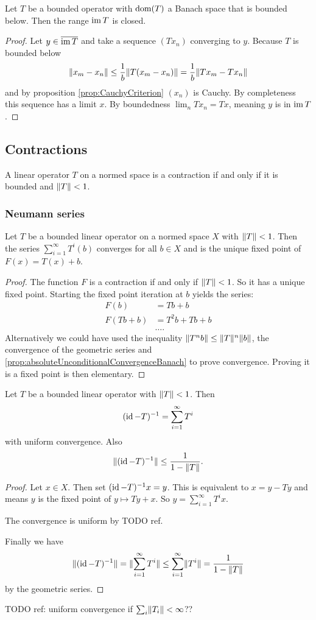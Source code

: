 \begin{proposition} \label{prop:boundedBelowClosedRange}
Let $T$ be a bounded operator with $\operatorname{dom}(T)$ a Banach space that is bounded below. Then the range $\operatorname{im} T$ is closed.
\end{proposition}
\begin{proof}
Let $y\in \overline{\operatorname{im} T}$ and take a sequence $(Tx_n)$ converging to $y$. Because $T$ is bounded below
\[ \lVert x_m-x_n\rVert \leq \frac{1}{b}\lVert T(x_m-x_n)\rVert = \frac{1}{b}\lVert Tx_m-Tx_n\rVert \]
and by proposition \ref{prop:CauchyCriterion} $(x_n)$ is Cauchy. By completeness this sequence has a limit $x$. By boundedness $\lim_n Tx_n = Tx$, meaning $y$ is in $\operatorname{im} T$.
\end{proof}

\subsection{Contractions}
A linear operator $T$ on a normed space is a contraction if and only if it is bounded and $\lVert T\rVert<1$. 

\subsubsection{Neumann series}
\begin{lemma}
Let $T$ be a bounded linear operator on a normed space $X$ with $\lVert T\rVert<1$. Then the series $\sum^\infty_{i=1}T^i(b)$ converges for all $b\in X$ and is the unique fixed point of $F(x) = T(x)+b$.
\end{lemma}
\begin{proof}
The function $F$ is a contraction if and only if $\lVert T\rVert<1$. So it has a unique fixed point. Starting the fixed point iteration at $b$ yields the series:
\begin{align*}
F(b) &= Tb + b \\
F(Tb+b) &= T^2b + Tb + b \\
&\hdots.
\end{align*}
Alternatively we could have used the inequality $\lVert T^nb\rVert \leq \lVert T\rVert^n\lVert b\rVert$, the convergence of the geometric series and \ref{prop:absoluteUnconditionalConvergenceBanach} to prove convergence. Proving it is a fixed point is then elementary.
\end{proof}
\begin{corollary} \label{corollary:NeumannSeries}
Let $T$ be a bounded linear operator with $\lVert T\rVert<1$. Then
\[ (\operatorname{id} - T)^{-1} = \sum_{i=1}^\infty T^i \]
with uniform convergence. Also
\[ \lVert(\operatorname{id} - T)^{-1}\rVert \leq \frac{1}{1-\lVert T\rVert}. \]
\end{corollary}
\begin{proof}
Let $x\in X$. Then set $(\operatorname{id} - T)^{-1}x = y$. This is equivalent to $x = y-Ty$ and means $y$ is the fixed point of $y\mapsto Ty+x$. So $y = \sum_{i=1}^\infty T^ix$.

The convergence is uniform by TODO ref.

Finally we have
\[ \lVert(\operatorname{id} - T)^{-1}\rVert = \lVert\sum_{i=1}^\infty T^i\rVert \leq \sum_{i=1}^\infty \lVert T^i\rVert = \frac{1}{1-\lVert T\rVert} \]
by the geometric series.
\end{proof}
TODO ref: uniform convergence if $\sum_i \lVert T_i\rVert < \infty$??

